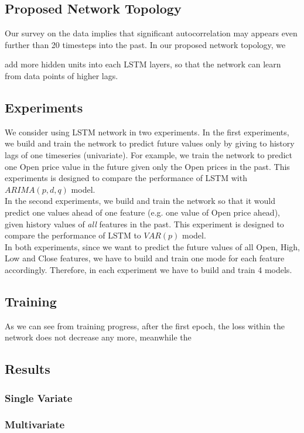 \documentclass[11pt]{article}
\begin{document}
\subsection{Proposed Network Topology}
Our survey on the data implies that significant autocorrelation may appears even
further than 20 timesteps into the past. In our proposed network topology, we

add more hidden units into each LSTM layers, so that the network can learn from
data points of higher lags.

\subsection{Experiments}
We consider using LSTM network in two experiments. In the first experiments, we
build and train the network to predict future values only by giving to history
lags of one timeseries (univariate). For example, we train the network to
predict one Open price value in the future given only the Open prices in the
past. This experiments is designed to compare the performance of LSTM with
$ARIMA(p, d, q)$ model.\\ 
In the second experiments, we build and train the network so that it would
predict one values ahead of one feature (e.g. one value of Open price ahead),
given history values of \textit{all} features in the past. This experiment is
designed to compare the performance of LSTM to $VAR(p)$ model.\\
In both experiments, since we want to predict the future values of all Open,
High, Low and Close features, we have to build and train one mode for each
feature accordingly. Therefore, in each experiment we have to build and train 4
models.

\subsection{Training}
As we can see from training progress, after the first epoch, the loss within the
network does not decrease any more, meanwhile the
\subsection{Results}

\subsubsection{Single Variate}

\subsubsection{Multivariate}
\end{document}
